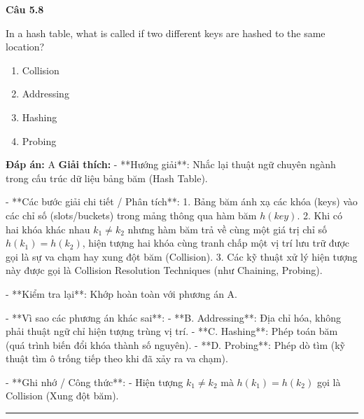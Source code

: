 \documentclass[11pt,a4paper]{article}
\newenvironment{question}[1]{%
  \par\vspace{1em}\noindent\textbf{\large Câu #1}\par\vspace{0.4em}
}{%
  \par\vspace{1em}\hrule\vspace{0.6em}
}
\newenvironment{choices}{%
  \begin{enumerate}[label=\textbf{\Alph*.},leftmargin=2.2em,itemsep=2pt,topsep=3pt]
}{%
  \end{enumerate}
}
\newcommand{\choice}{\item}
\begin{document}
\begin{question}{5.8}
In a hash table, what is called if two different keys are hashed to the same location?
\begin{choices}
\choice Collision
\choice Addressing
\choice Hashing
\choice Probing
\end{choices}
\textbf{Đáp án:} A
\textbf{Giải thích:} - **Hướng giải**:
  Nhắc lại thuật ngữ chuyên ngành trong cấu trúc dữ liệu bảng băm (Hash Table).

- **Các bước giải chi tiết / Phân tích**:
  1. Bảng băm ánh xạ các khóa (keys) vào các chỉ số (slots/buckets) trong mảng thông qua hàm băm \(h(key)\).
  2. Khi có hai khóa khác nhau \(k_1 \neq k_2\) nhưng hàm băm trả về cùng một giá trị chỉ số \(h(k_1) = h(k_2)\), hiện tượng hai khóa cùng tranh chấp một vị trí lưu trữ được gọi là sự va chạm hay xung đột băm (Collision).
  3. Các kỹ thuật xử lý hiện tượng này được gọi là Collision Resolution Techniques (như Chaining, Probing).

- **Kiểm tra lại**:
  Khớp hoàn toàn với phương án A.

- **Vì sao các phương án khác sai**:
  - **B. Addressing**: Địa chỉ hóa, không phải thuật ngữ chỉ hiện tượng trùng vị trí.
  - **C. Hashing**: Phép toán băm (quá trình biến đổi khóa thành số nguyên).
  - **D. Probing**: Phép dò tìm (kỹ thuật tìm ô trống tiếp theo khi đã xảy ra va chạm).

- **Ghi nhớ / Công thức**:
  - Hiện tượng \(k_1 \neq k_2\) mà \(h(k_1) = h(k_2)\) gọi là Collision (Xung đột băm).
\end{question}
\end{document}

